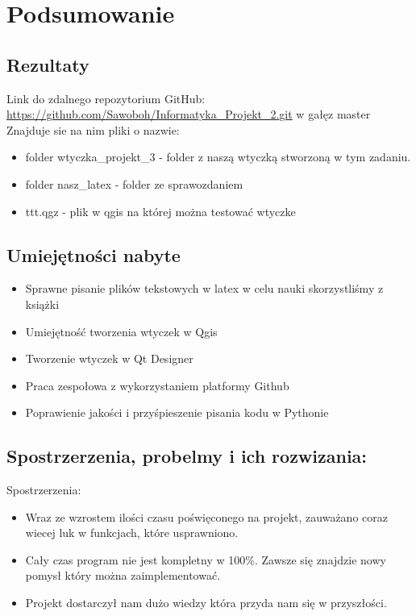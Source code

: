 \section{Podsumowanie}

\subsection{Rezultaty}
Link do zdalnego repozytorium GitHub: \href{https://github.com/Sawoboh/Informatyka_Projekt_2.git}{https://github.com/Sawoboh/Informatyka\_Projekt\_2.git} w gałęz master \\
Znajduje sie na nim pliki o nazwie:
\begin{itemize}
	\item folder wtyczka\_projekt\_3 - folder z naszą wtyczką stworzoną w tym zadaniu.
	\item folder nasz\_latex - folder ze sprawozdaniem
	\item ttt.qgz - plik w qgis na której można testować wtyczke
\end{itemize}

\subsection{Umiejętności nabyte}
\begin{itemize}
	\item Sprawne pisanie plików tekstowych w latex w celu nauki skorzystliśmy z książki \citep{Borkowski.Przybylski2015}
	\item Umiejętność tworzenia wtyczek w Qgis 
	\item Tworzenie wtyczek w Qt Designer 
	\item Praca zespołowa z wykorzystaniem platformy Github
	\item Poprawienie jakości i przyśpieszenie pisania kodu w Pythonie
\end{itemize}

\subsection{Spostrzerzenia, probelmy i ich rozwizania:}
Spostrzerzenia:
\begin{itemize}
	\item Wraz ze wzrostem ilości czasu poświęconego na projekt, zauważano coraz wiecej luk w funkcjach, które usprawniono.
	\item Cały czas program nie jest kompletny w 100\%. Zawsze się znajdzie nowy pomysł który można zaimplementować.
	\item Projekt dostarczył nam dużo wiedzy która przyda nam się w przyszłości.
\end{itemize}

